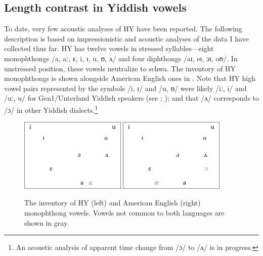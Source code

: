 \documentclass[output=paper]{langsci/langscibook}
\begin{document}
\subsection{Length contrast in Yiddish vowels}
\label{sec:nove:2.3}

To date, very few acoustic analyses of HY have been reported. The following description is based on impressionistic and acoustic analyses of the data I have collected thus far. HY has twelve vowels in stressed syllables—eight monophthongs /a, aː, ɛ, i, ɪ, u, ʊ, ʌ/ and four diphthongs /aɪ, eɪ, ɔɪ, oʊ/. In unstressed position, these vowels neutralize to schwa. The inventory of HY monophthongs is shown alongside American English ones in . Note that HY high vowel pairs represented by the symbols /i, ɪ/ and /u, ʊ/ were likely /iː, i/ and /uː, u/ for Gen1/Unterland Yiddish speakers (see \citealt{Nove2020}; \citealt{Weinreich1964}); and that /ʌ/ corresponds to /ɔ/ in other Yiddish dialects.\footnote{An acoustic analysis of apparent time change from /ɔ/ to /ʌ/ is in progress.} 

\begin{figure}
\includegraphics[width=0.45\textwidth]{figures/nove-fig3-1.pdf}\hfill
\includegraphics[width=0.45\textwidth]{figures/nove-fig3-2.pdf}
\caption{The inventory of HY (left) and American English (right) monophthong vowels. Vowels not common to both languages are shown in gray.\label{fig:nove:3}} 
\end{figure}
\end{document}
